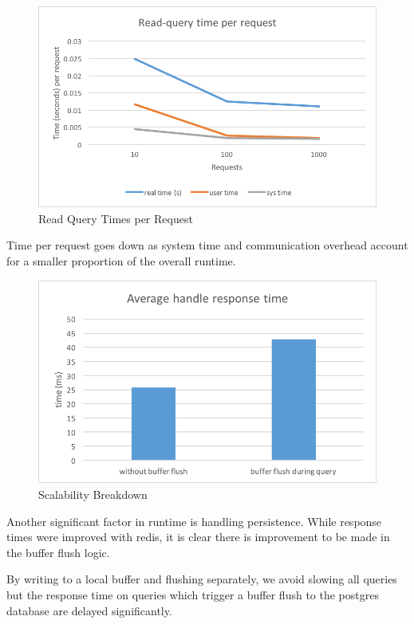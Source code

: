 \documentclass[titlepage, 11pt]{article}
\newcommand\0{\mathbf{0}}
\newcommand\<{\langle}
\renewcommand\>{\rangle}
\begin{document}
\begin{figure}[H]
\centering
\includegraphics[width=\linewidth]{read-query-times-per-request.png}
\caption{Read Query Times per Request}
\end{figure}

Time per request goes down as system time and communication overhead account for a smaller proportion of the overall runtime.

\begin{figure}[H]
\centering
\includegraphics[width=\linewidth]{handle_response_times.png}
\caption{Scalability Breakdown}
\end{figure}

Another significant factor in runtime is handling persistence. While response times were improved with redis, it is clear there is improvement to be made in the buffer flush logic.

By writing to a local buffer and flushing separately, we avoid slowing all queries but the response time on queries which trigger a buffer flush to the postgres database are delayed significantly.
\end{document}
